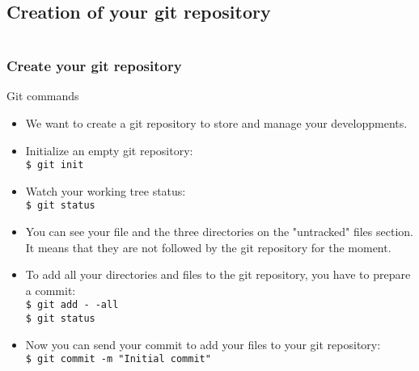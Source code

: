 \documentclass[10pt, hyperref={unicode=true,pdfusetitle, bookmarks=true,bookmarksnumbered=false,bookmarksopen=false, breaklinks=false,pdfborder={0 0 1},backref=true,colorlinks=true,linkcolor=darkblue,pageanchor, urlcolor=darkblue}]{beamer}
\begin{document}
\subsection{{\bf{Creation of your git repository}}}
\begin{frame}
\begin{columns}[c] 
\tableofcontents[sections={1-4},currentsection, currentsubsection]
\tableofcontents[sections={5-8},currentsection, currentsubsection]
\end{columns}
\end{frame}
\begin{frame}
\frametitle{Create your git repository}

\begin{alertblock}{Git commands}
\begin{itemize}
\item We want to create a git repository to store and manage your developpments.
\item Initialize an empty git repository:\\
\texttt{\$ git init}\\

\item Watch your working tree status:\\
\texttt{\$ git status}\\

\item You can see your file and the three directories on the "untracked" files section.
It means that they are not followed by the git repository for the moment.

\item To add all your directories and files to the git repository, you have to prepare a commit:\\
\texttt{\$ git add -\,-all}\\
\texttt{\$ git status}\\

\item Now you can send your commit to add your files to your git repository:\\
\texttt{\$ git commit -m "Initial commit"}\\
\end{itemize}

\end{alertblock}
\end{frame}
\end{document}
